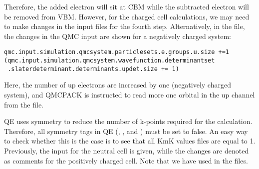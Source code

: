 Therefore, the added electron will sit at CBM while the subtracted electron will be removed from VBM. 
However, for the charged cell calculations, we may need to make changes in the input files for the fourth step.  Alternatively, in the  file, the changes in the QMC input are shown for a negatively charged system:
\begin{lstlisting}[style=Python]
qmc.input.simulation.qmcsystem.particlesets.e.groups.u.size +=1
(qmc.input.simulation.qmcsystem.wavefunction.determinantset
 .slaterdeterminant.determinants.updet.size += 1)
\end{lstlisting}
Here, the number of up electrons are increased by one (negatively charged system), and QMCPACK is instructed to read more one orbital in the up channel from the  file. 

QE uses symmetry to reduce the number of k-points required for the calculation. 
Therefore, all symmetry tags in QE (, , and ) must be set to false. 
An easy way to check whether this is the case is to see that all KmK values  files are equal to 1. 
Previously, the input for the neutral cell is given, while the changes are denoted as comments for the positively charged cell. 
Note that we have used  in the  files.
